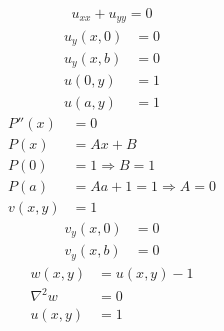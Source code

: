 \documentclass[../../HW08.tex]{subfiles}
\begin{document}
\begin{gather*}
    u_{xx}+u_{yy}=0
\end{gather*}
\begin{align*}
    u_{y}(x,0) & = 0 \\
    u_{y}(x,b) & = 0 \\
    u(0,y)     & = 1 \\
    u(a,y)     & = 1
\end{align*}
\begin{align*}
    P''(x) & =0                            \\
    P(x)   & = Ax+B                        \\
    P(0)   & =1 \Rightarrow B=1            \\
    P(a)   & = Aa + 1 = 1 \Rightarrow A=0 \\
    v(x,y) & = 1
\end{align*}
\begin{align*}
    v_{y}(x,0) & =0 \\
    v_{y}(x,b) & =0
\end{align*}
\begin{align*}
    w(x,y)      & =u(x,y)-1 \\
    \nabla^{2}w & =0        \\
    u(x,y)      & =1
\end{align*}
\end{document}
